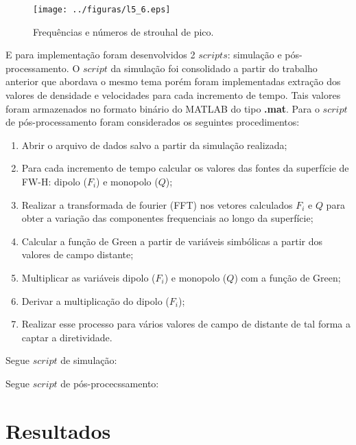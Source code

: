 \begin{figure}[h!]
    \centering
    \hspace{-1.cm}
    \label{fig6}
    \texttt{[image: ../figuras/l5\_6.eps]}
    \caption{Frequências e números de strouhal de pico.}
\end{figure}

E para implementação foram desenvolvidos 2 $scripts$: simulação e pós-processamento. O $script$ da simulação foi consolidado a partir do trabalho anterior que abordava o mesmo tema porém foram implementadas extração dos valores de densidade e velocidades para cada incremento de tempo. Tais valores foram armazenados no formato binário do MATLAB do tipo \textbf{.mat}. Para o $script$ de pós-processamento foram considerados os seguintes procedimentos:
\begin{enumerate}
    \item Abrir o arquivo de dados salvo a partir da simulação realizada;
    \item Para cada incremento de tempo calcular os valores das fontes da superfície de FW-H: dipolo ($F_{i}$) e monopolo ($Q$);
    \item Realizar a transformada de fourier (FFT) nos vetores calculados $F_{i}$ e $Q$ para obter a variação das componentes frequenciais ao longo da superfície;
    \item Calcular a função de Green a partir de variáveis simbólicas a partir dos valores de campo distante;
    \item Multiplicar as variáveis dipolo ($F_{i}$) e monopolo ($Q$) com a função de Green;
    \item Derivar a multiplicação do dipolo ($F_{i}$);
    \item Realizar esse processo para vários valores de campo de distante de tal forma a captar a diretividade.
\end{enumerate}

Segue $script$ de simulação:


Segue $script$ de pós-procecssamento:


\chapter{Resultados}

